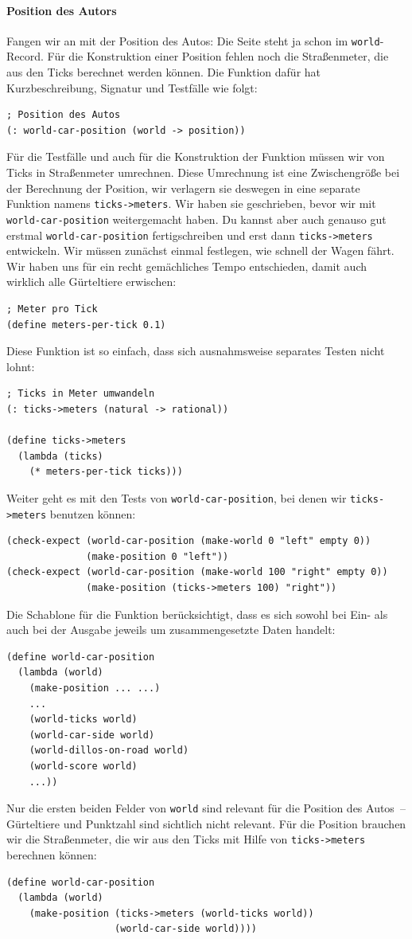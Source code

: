 \paragraph{Position des Autors}
Fangen wir an mit der Position des Autos: Die Seite steht ja schon im
\lstinline{world}-Record.  Für die Konstruktion einer Position fehlen
noch die Straßenmeter, die aus den Ticks berechnet werden können.  Die
Funktion dafür hat Kurzbeschreibung, Signatur und Testfälle wie folgt:
%
\begin{lstlisting}
; Position des Autos
(: world-car-position (world -> position))
\end{lstlisting}
%
Für die Testfälle und auch für die Konstruktion der Funktion müssen
wir von Ticks in Straßenmeter umrechnen.  Diese Umrechnung ist eine
Zwischengröße bei der Berechnung der Position, wir verlagern sie
deswegen in eine separate Funktion namens \lstinline{ticks->meters}.
Wir haben sie geschrieben, bevor wir mit
\lstinline{world-car-position} weitergemacht haben.  Du kannst aber
auch genauso gut erstmal \lstinline{world-car-position}
fertigschreiben und erst dann \lstinline{ticks->meters} entwickeln.
Wir müssen zunächst einmal festlegen, wie schnell der Wagen fährt.
Wir haben uns für ein recht gemächliches Tempo entschieden, damit auch
wirklich alle Gürteltiere erwischen:
%
\begin{lstlisting}
; Meter pro Tick
(define meters-per-tick 0.1)
\end{lstlisting}
%
Diese Funktion ist so einfach, dass sich ausnahmsweise separates
Testen nicht lohnt:
%
\begin{lstlisting}
; Ticks in Meter umwandeln
(: ticks->meters (natural -> rational))

(define ticks->meters
  (lambda (ticks)
    (* meters-per-tick ticks)))
\end{lstlisting}
%
Weiter geht es mit den Tests von \lstinline{world-car-position}, bei
denen wir \lstinline{ticks->meters} benutzen können:
%
\begin{lstlisting}
(check-expect (world-car-position (make-world 0 "left" empty 0))
              (make-position 0 "left"))
(check-expect (world-car-position (make-world 100 "right" empty 0))
              (make-position (ticks->meters 100) "right"))
\end{lstlisting}
%
Die Schablone für die Funktion berücksichtigt, dass es sich sowohl bei
Ein- als auch bei der Ausgabe jeweils um zusammengesetzte Daten handelt:
%
\begin{lstlisting}
(define world-car-position
  (lambda (world)
    (make-position ... ...)
    ...
    (world-ticks world)
    (world-car-side world)
    (world-dillos-on-road world)
    (world-score world)
    ...))
\end{lstlisting}
%
Nur die ersten beiden Felder von \lstinline{world} sind relevant für
die Position des Autos~-- Gürteltiere und Punktzahl sind sichtlich
nicht relevant.  Für die Position brauchen wir die Straßenmeter, die
wir aus den Ticks mit Hilfe von \lstinline{ticks->meters} berechnen
können:
%
\begin{lstlisting}
(define world-car-position
  (lambda (world)
    (make-position (ticks->meters (world-ticks world))
                   (world-car-side world))))
\end{lstlisting}
%
